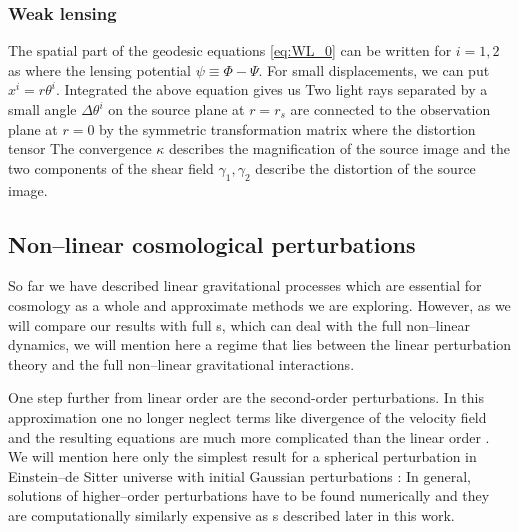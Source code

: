 \subsubsection{Weak lensing}
The spatial part of the geodesic equations \eqref{eq:WL_0} can be written for $i=1,2$ as
where the lensing potential $\psi\equiv\Phi-\Psi$. For small displacements, we can put $x^i=r\theta^i$. Integrated the above equation gives us
Two light rays separated by a small angle  $\Delta\theta^i$ on the source plane at $r=r_s$ are connected to the observation plane at $r=0$ by the symmetric transformation matrix
where the distortion tensor
The convergence $\kappa$ describes the magnification of the source image and the two components of the shear field $\gamma_1,\gamma_2$ describe the distortion of the source image.
\subsection{Non--linear cosmological perturbations}
So far we have described linear gravitational processes which are essential for cosmology as a whole and approximate methods we are exploring. However, as we will compare our results with full \nbodysim s, which can deal with the full non--linear dynamics, we will mention here a regime that lies between the linear perturbation theory and the full non--linear gravitational interactions.

One step further from linear order are the second-order perturbations. In this approximation one no longer neglect terms like divergence of the velocity field and the resulting equations are much more complicated than the linear order \textcite[see e.g.][]{2004astro.ph.12025T,10.1093/mnras/264.2.375,2010deto.book.....A}. We will mention here only the simplest result for a spherical perturbation in Einstein--de Sitter universe with initial Gaussian perturbations \textcite{1980_Peebles}:
In general, solutions of higher--order perturbations have to be found numerically and they are computationally similarly expensive as \nbodysim s described later in this work.

